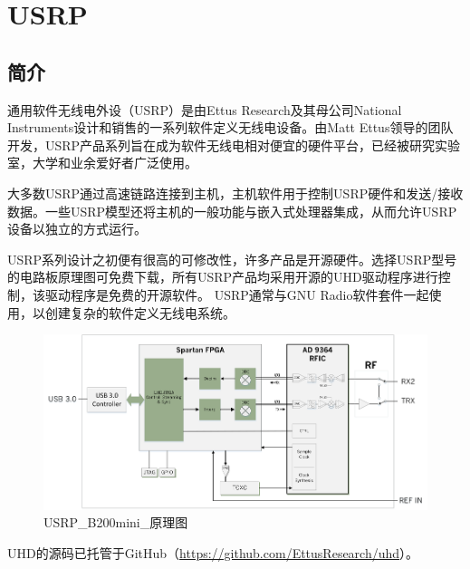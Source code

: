 	\section{USRP}
		\subsection{简介}
			\par 通用软件无线电外设（USRP）是由Ettus Research及其母公司National Instruments设计和销售的一系列软件定义无线电设备。由Matt Ettus领导的团队开发，USRP产品系列旨在成为软件无线电相对便宜的硬件平台，已经被研究实验室，大学和业余爱好者广泛使用。
			\par 大多数USRP通过高速链路连接到主机，主机软件用于控制USRP硬件和发送/接收数据。一些USRP模型还将主机的一般功能与嵌入式处理器集成，从而允许USRP设备以独立的方式运行。
			\par USRP系列设计之初便有很高的可修改性，许多产品是开源硬件。选择USRP型号的电路板原理图可免费下载，所有USRP产品均采用开源的UHD驱动程序进行控制，该驱动程序是免费的开源软件。 USRP通常与GNU Radio软件套件一起使用，以创建复杂的软件定义无线电系统。\cite{ wiki:USRP}
			\begin{figure}[htb]
				\centering
				\includegraphics[width=13cm]{figures/USRP_B200mini_BD.png}
				\caption{USRP\_B200mini\_原理图}
				\label{fig:USRP_B200mini_原理图}
			\end{figure}
			\par UHD的源码已托管于GitHub（\href{https://github.com/EttusResearch/uhd}{https://github.com/EttusResearch/uhd}）。
